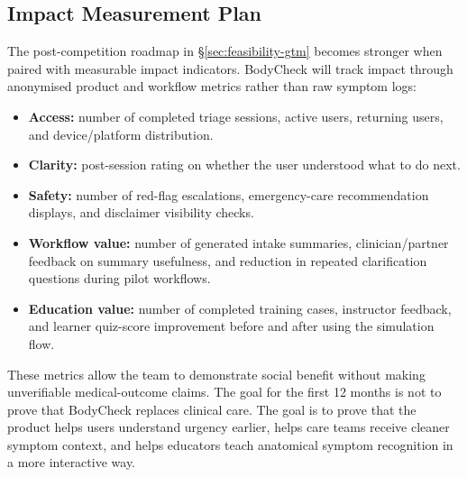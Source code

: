 \subsection{Impact Measurement Plan}
\label{sec:impact-measurement}

The post-competition roadmap in \S\ref{sec:feasibility-gtm} becomes stronger
when paired with measurable impact indicators. BodyCheck will track impact
through anonymised product and workflow metrics rather than raw symptom logs:

\begin{itemize}[leftmargin=2em, itemsep=3pt, topsep=4pt]
  \item \textbf{Access:} number of completed triage sessions, active users,
        returning users, and device/platform distribution.
  \item \textbf{Clarity:} post-session rating on whether the user understood
        what to do next.
  \item \textbf{Safety:} number of red-flag escalations, emergency-care
        recommendation displays, and disclaimer visibility checks.
  \item \textbf{Workflow value:} number of generated intake summaries,
        clinician/partner feedback on summary usefulness, and reduction in
        repeated clarification questions during pilot workflows.
  \item \textbf{Education value:} number of completed training cases,
        instructor feedback, and learner quiz-score improvement before and
        after using the simulation flow.
\end{itemize}

These metrics allow the team to demonstrate social benefit without making
unverifiable medical-outcome claims. The goal for the first 12 months is not
to prove that BodyCheck replaces clinical care. The goal is to prove that the
product helps users understand urgency earlier, helps care teams receive
cleaner symptom context, and helps educators teach anatomical symptom
recognition in a more interactive way.

